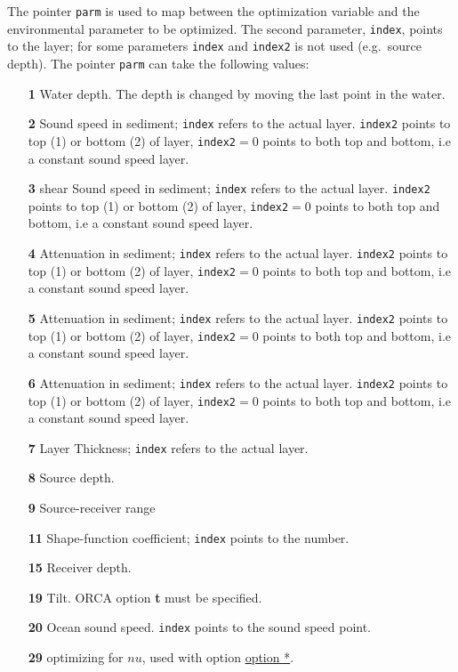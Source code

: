 \documentclass{saclantc}
\begin{document}
The pointer {\tt parm} is used to map between the optimization variable and the
environmental parameter to be optimized. The second parameter, {\tt index}, points to the
layer; for some parameters {\tt index} and {\tt index2}  is not used (e.g.\ source depth).  
The pointer {\tt parm} can take the following values:
\begin{itemize}
   \item[\bf 1]  Water depth. The depth is changed by moving the last 
point in the water.
\vspace{-0.3cm}
    \item[\bf 2] Sound speed in sediment; {\tt index} refers to the
    actual layer. {\tt index2} points to top (1) or bottom (2) of
    layer,  {\tt index2}$=0$ points to both top and bottom, i.e a
    constant sound speed layer.
\vspace{-0.3cm}
    \item[\bf 3] shear Sound speed in sediment; {\tt index} refers to the
    actual layer. {\tt index2} points to top (1) or bottom (2) of
    layer,  {\tt index2}$=0$ points to both top and bottom, i.e a
    constant sound speed layer.
\vspace{-0.3cm}
    \item[\bf 4] Attenuation in sediment; {\tt index} refers to the
    actual layer. {\tt index2} points to top (1) or bottom (2) of
    layer,  {\tt index2}$=0$ points to both top and bottom, i.e a
    constant sound speed layer.
    \item[\bf 5] Attenuation in sediment; {\tt index} refers to the
    actual layer. {\tt index2} points to top (1) or bottom (2) of
    layer,  {\tt index2}$=0$ points to both top and bottom, i.e a
    constant sound speed layer.
    \item[\bf 6] Attenuation in sediment; {\tt index} refers to the
    actual layer. {\tt index2} points to top (1) or bottom (2) of
    layer,  {\tt index2}$=0$ points to both top and bottom, i.e a
    constant sound speed layer.
    \item[\bf 7] Layer Thickness; {\tt index} refers to the
    actual layer. 
\vspace{-0.3cm}
    \item[\bf 8] Source depth.
\vspace{-0.3cm}
    \item[\bf 9] Source-receiver range
\vspace{-0.3cm}
    \item[\bf 11] Shape-function coefficient; {\tt index} points to the number.
\vspace{-0.3cm}
    \item[\bf 15]  Receiver depth.
\vspace{-0.3cm}
    \item[\bf 19] Tilt. {\sf ORCA} option {\bf t} must be specified.

\vspace{-0.3cm}
    \item[\bf 20] Ocean sound speed. {\tt index} points to the sound
    speed point.
  \item[\bf 29] optimizing for $nu$, used with option \underline{option *}.
\end{itemize}
\end{document}
